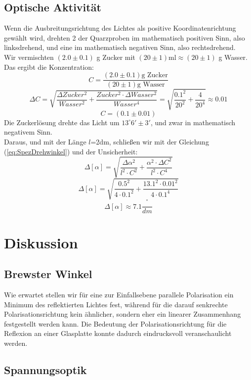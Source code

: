 \documentclass[twoside]{article}
\begin{document}
\subsection{Optische Aktivität}
Wenn die Ausbreitungsrichtung des Lichtes als positive Koordinatenrichtung gewählt wird, drehten 2 der Quarzproben im mathematisch positiven Sinn, also linksdrehend, und eine im mathematisch negativen Sinn, also rechtsdrehend.\\
Wir vermischten $(2.0 \pm 0.1)$ g Zucker mit $(20 \pm 1)\text{ml} \approx (20 \pm 1)$ g Wasser. Das ergibt die Konzentration:
$$C=\frac{(2.0 \pm 0.1) \text{g Zucker}}{(20 \pm 1) \text{g Wasser}}$$
$$\Delta C= \sqrt{\frac{\Delta Zucker^2}{Wasser^2}+\frac{Zucker^2 \cdot \Delta Wasser^2}{Wasser^4}} = \sqrt{\frac{0.1^2}{20^2}+\frac{4}{20^4}}\approx 0.01$$
\vspace{0.5cm}
$$C=(0.1\pm0.01)$$
Die Zuckerlösung drehte das Licht um $13^\circ 6' \pm 3'$, und zwar in mathematisch negativem Sinn. \\
Daraus, und mit der Länge $l$=2dm, schließen wir mit der Gleichung (\ref{eq:SpezDrehwinkel}) und der Unsicherheit:
$$\Delta [\alpha] = \sqrt{\frac{\Delta \alpha^2}{l^2\cdot C^2}+\frac{\alpha^2 \cdot \Delta C ^2}{l^2\cdot C^4}}$$
$$\Delta [\alpha] = \sqrt{\frac{0.5^2}{4\cdot 0.1^2}+\frac{13.1^2\cdot 0.01^2}{4 \cdot 0.1^4}}$$
$$\Delta [\alpha] \approx 7.1 \frac{^\circ}{dm}$$

\begin{center}
\end{center}
\section{Diskussion}
\subsection{Brewster Winkel}
Wie erwartet stellen wir für eine zur Einfallsebene parallele Polarisation ein Minimum des reflektierten Lichtes fest, während für die darauf senkrechte Polarisationsrichtung kein ähnlicher, sondern eher ein linearer Zusammenhang festgestellt werden kann. Die Bedeutung der Polarisationsrichtung für die Reflexion an einer Glasplatte konnte dadurch eindrucksvoll veranschaulicht werden.
\subsection{Spannungsoptik}
\end{document}
